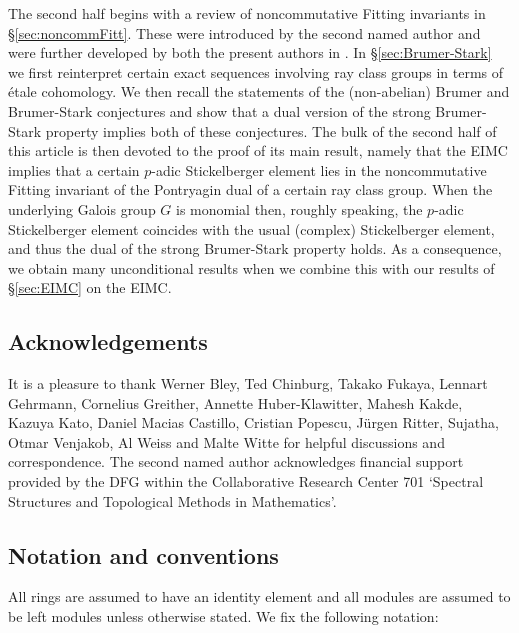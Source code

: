 \documentclass[12pt]{amsart}
\theoremstyle{plain}
\theoremstyle{remark}
\theoremstyle{definition}
\numberwithin{equation}{section}
\begin{document}
The second half begins with a review of noncommutative Fitting invariants in \S \ref{sec:noncommFitt}.
These were introduced by the second named author \cite{MR2609173} and were further developed by both the present authors in \cite{MR3092262}.
In \S \ref{sec:Brumer-Stark} we first reinterpret certain exact sequences involving ray class groups in terms of \'{e}tale cohomology.
We then recall the statements of the (non-abelian) Brumer and Brumer-Stark conjectures and show that a dual
version of the strong Brumer-Stark property implies both of these conjectures.
The bulk of the second half of this article is then devoted to the proof of its main result, 
namely that the EIMC implies that a certain $p$-adic Stickelberger element lies in the noncommutative Fitting
invariant of the Pontryagin dual of a certain ray class group. When the underlying Galois group $G$
is monomial then, roughly speaking,
the $p$-adic Stickelberger element coincides with the usual (complex) Stickelberger element, and
thus the dual of the strong Brumer-Stark property holds. 
As a consequence, we obtain many unconditional results
when we combine this with our results of \S \ref{sec:EIMC} on the EIMC.

\subsection*{Acknowledgements}
It is a pleasure to thank Werner Bley, Ted Chinburg, Takako Fukaya, Lennart Gehrmann, Cornelius Greither, Annette Huber-Klawitter, 
Mahesh Kakde, Kazuya Kato, Daniel Macias Castillo, Cristian Popescu, J\"urgen Ritter, Sujatha, Otmar Venjakob, Al Weiss and Malte Witte 
for helpful discussions and correspondence.
The second named author acknowledges financial support provided by the DFG within the Collaborative Research Center 701
`Spectral Structures and Topological Methods in Mathematics'.

\subsection*{Notation and conventions}
All rings are assumed to have an identity element and all modules are assumed
to be left modules unless otherwise  stated. We fix the following notation:

\medskip
\end{document}

